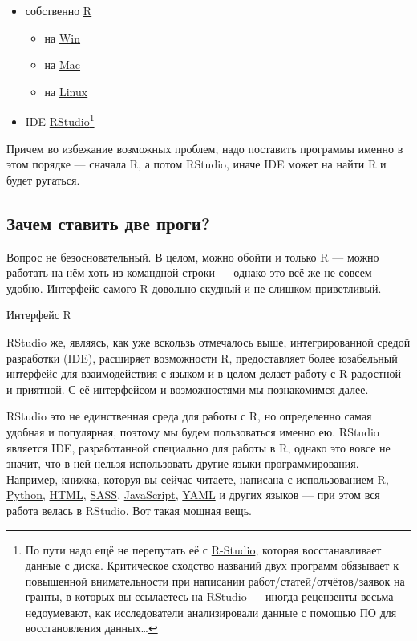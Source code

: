 \documentclass[
  letterpaper,
  DIV=11,
  numbers=noendperiod]{scrreprt}
\providecommand{\tightlist}{%
  \setlength{\itemsep}{0pt}\setlength{\parskip}{0pt}}\usepackage{longtable,booktabs,array}
\theoremstyle{definition}
\theoremstyle{remark}
\begin{document}
\begin{itemize}
\tightlist
\item
  собственно \href{https://cran.r-project.org/}{R}

  \begin{itemize}
  \tightlist
  \item
    на \href{https://cran.r-project.org/bin/windows/base/}{Win}
  \item
    на \href{https://cran.r-project.org/bin/macosx/}{Mac}
  \item
    на \href{https://cran.rstudio.com/bin/linux/}{Linux}
  \end{itemize}
\item
  IDE
  \href{https://posit.co/download/rstudio-desktop/}{RStudio}\footnote{По
    пути надо ещё не перепутать её с
    \href{https://www.r-studio.com/ru/}{R-Studio}, которая
    восстанавливает данные с диска. Критическое сходство названий двух
    программ обязывает к повышенной внимательности при написании
    работ/статей/отчётов/заявок на гранты, в которых вы ссылаетесь на
    RStudio --- иногда рецензенты весьма недоумевают, как исследователи
    анализировали данные с помощью ПО для восстановления данных\ldots{}}
\end{itemize}

Причем во избежание возможных проблем, надо поставить программы именно в
этом порядке --- сначала R, а потом RStudio, иначе IDE может на найти R
и будет ругаться.

\subsection{Зачем ставить две проги?}\label{rbasics-why-we-need-both}

Вопрос не безосновательный. В целом, можно обойти и только R --- можно
работать на нём хоть из командной строки --- однако это всё же не совсем
удобно. Интерфейс самого R довольно скудный и не слишком приветливый.

Интерфейс R

RStudio же, являясь, как уже вскользь отмечалось выше, интегрированной
средой разработки (IDE), расширяет возможности R, предоставляет более
юзабельный интерфейс для взаимодействия с языком и в целом делает работу
с R радостной и приятной. С её интерфейсом и возможностями мы
познакомимся далее.

RStudio это не единственная среда для работы с R, но определенно самая
удобная и популярная, поэтому мы будем пользоваться именно ею. RStudio
является IDE, разработанной специально для работы в R, однако это вовсе
не значит, что в ней нельзя использовать другие языки программирования.
Например, книжка, которуя вы сейчас читаете, написана с использованием
\href{https://www.r-project.org/about.html}{R},
\href{https://www.python.org/}{Python},
\href{http://htmlbook.ru/html}{HTML},
\href{https://sass-lang.com/}{SASS},
\href{https://learn.javascript.ru/}{JavaScript},
\href{https://yaml.org/}{YAML} и других языков --- при этом вся работа
велась в RStudio. Вот такая мощная вещь.
\end{document}
